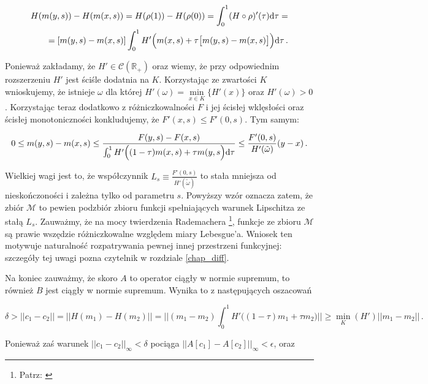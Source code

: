 \begin{equation*}
\begin{split}
H(m(y,s))-H(m(x,s)) = H(\rho(1))-H(\rho(0)) = \int_{0}^{1} (H \circ \rho)'(\tau) \mathrm{d} \tau =\\
=  [m(y,s)-m(x,s)]\int_{0}^{1} H'\Bigl(m(x,s) + \tau \big[ m(y,s) - m(x,s) \big] \Bigl)\mathrm{d} \tau\,.
\end{split}
\end{equation*}

Ponieważ zakładamy, że $ H' \in \mathcal{C}(\mathbb{R}_{+}) $ oraz wiemy, że przy odpowiednim rozszerzeniu $ H' $ jest ściśle dodatnia na $ K $. Korzystając ze zwartości $ K $ wnioskujemy, że istnieje $ \omega $ dla której $ H'(\omega) = \underset{x \in K}{\min}\{H'(x) \} $ oraz $ H'(\omega) > 0 $ . Korzystając teraz dodatkowo z różniczkowalności $ F $ i jej ścisłej wklęsłości oraz ścisłej monotoniczności konkludujemy, że $ F'(x,s) \leq F'(0,s) $. Tym samym:

\begin{equation}\label{lipschitzness of M}
0 \leq m(y,s)-m(x,s) \leq \frac{F(y,s) - F(x,s)}{\int_{0}^{1} H'\Bigl((1-\tau)m(x,s) + \tau m(y,s\Bigl)\mathrm{d} \tau} \leq \frac{F'(0,s)}{H'(\tilde{\omega})}(y-x)\,.
\end{equation}  

Wielkiej wagi jest to, że współczynnik $ L_s \equiv \frac{F'(0,s)}{H'(\tilde{\omega})} $ to stała mniejsza od nieskończoności i zależna tylko od parametru $ s $. Powyższy wzór oznacza zatem, że zbiór $ \mathcal{M} $ to pewien podzbiór zbioru funkcji spełniających warunek Lipschitza ze stałą $ L_s $. Zauważmy, że na mocy twierdzenia Rademachera \footnote{Patrz: \citet[][twr. 3, str. 19]{Heinonen}}, funkcje ze zbioru $ \mathcal{M} $ są prawie wszędzie różniczkowalne względem miary Lebesgue'a. Wniosek ten motywuje naturalność rozpatrywania pewnej innej przestrzeni funkcyjnej: szczegóły tej uwagi pozna czytelnik w rozdziale \ref{chap_diff}.  

Na koniec zauważmy, że skoro $A$ to operator ciągły w normie supremum, to również $B$ jest ciągły w normie supremum. Wynika to z następujących oszacowań

\begin{equation*}
	\delta > || c_1 - c_2||= || H(m_1) - H(m_2)|| = || (m_1 - m_2)\int_{0}^{1} H'\bigl((1-\tau )m_1 + \tau m_2 \bigl)|| \geq \underset{K}{\min}(H') ||m_1 - m_2 ||\,.
\end{equation*}

Ponieważ zaś warunek $|| c_1 - c_2||_{\infty} < \delta$ pociąga $|| A[c_1] - A[c_2]||_{\infty} <\epsilon$, oraz

